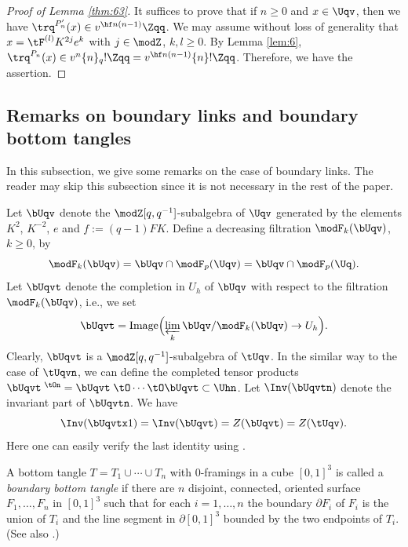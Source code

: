 \documentclass{amsart}
\numberwithin{equation}{section}
\numberwithin{figure}{section}
\theoremstyle{plain}
\theoremstyle{definition}
\theoremstyle{remark}
\begin{document}
\begin{proof}[Proof of Lemma \ref{thm:63}]
  It suffices to prove that if $n\ge 0$ and $x\in \Uqv$, then we have
  $\trq^{P'_n}(x)\in v^{\hf n(n-1)}\Zqq$.  We may assume without loss of
  generality that $x=\tF^{(l)}K^{2j}e^k$ with $j\in \modZ $, $k,l\ge 0$.  By
  Lemma \ref{lem:6}, $\trq^{P_n}(x)\in v^n\{n\}_q!\Zqq=v^{\hf
  n(n-1)}\{n\}!\Zqq$.  Therefore, we have the assertion.
\end{proof}

\subsection{Remarks on boundary links and boundary bottom tangles}
\label{sec:remarks-bound-links}

In this subsection, we give some remarks on the case of boundary
links.  The reader may skip this subsection since it is not necessary
in the rest of the paper.

Let $\bUqv$ denote the $\modZ [q,q^{-1}]$-subalgebra of $\Uqv$ generated
by the elements $K^2$, $K^{-2}$, $e$ and $f:=(q-1)FK$.  Define a
decreasing filtration $\modF _k(\bUqv)$, $k\ge 0$, by
\begin{equation*}
  \modF _k(\bUqv)=\bUqv\cap \modF _p(\Uqv)=\bUqv\cap \modF _p(\Uq).
\end{equation*}
Let $\bUqvt$ denote the completion in $U_h$ of $\bUqv$ with respect to
the filtration $\modF _k(\bUqv)$, i.e., we set
\begin{equation*}
  \bUqvt=\operatorname{Image}\Bigl(\varprojlim_k\bUqv/\modF _k(\bUqv)\rightarrow U_h\Bigr).
\end{equation*}
Clearly, $\bUqvt$ is a $\modZ [q,q^{-1}]$-subalgebra of $\tUqv$.  In the
similar way to the case of $\tUqvn$, we can define the completed
tensor products $\bUqvt\;^{\tOn}=\bUqvt\;\tO\cdots\tO\bUqvt\subset \Uhn$.
Let $\Inv(\bUqvtn)$ denote the invariant part of $\bUqvtn$.  We have
\begin{equation*}
  \Inv(\bUqvtx1)=\Inv(\bUqvt)=Z(\bUqvt)=Z(\tUqv).
\end{equation*}
Here one can easily verify the last identity using \cite[Section
9]{H:uqsl2}.

A bottom tangle $T=T_1\cup \cdots\cup T_n$ with $0$-framings in a cube $[0,1]^3$
is called a {\em boundary bottom tangle} if there are $n$ disjoint,
connected, oriented surface $F_1,\ldots,F_n$ in $[0,1]^3$ such that for
each $i=1,\ldots,n$ the boundary $\partial F_i$ of $F_i$ is the union of $T_i$
and the line segment in $\partial [0,1]^3$ bounded by the two endpoints of
$T_i$.  (See also \cite[Section 9.3]{H:universal}.)
\end{document}
